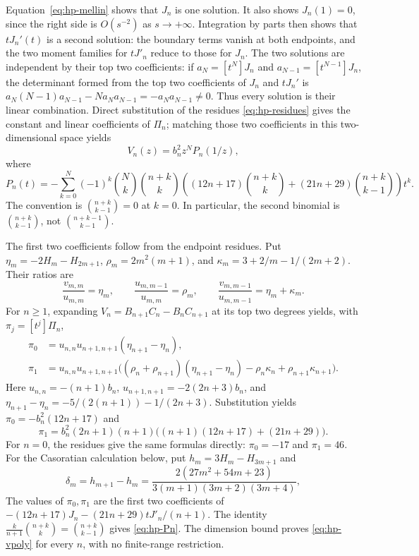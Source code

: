 Equation~\eqref{eq:hp-mellin} shows that $J_n$ is one solution.  It also
shows $J_n(1)=0$, since the right side is $O(s^{-2})$ as $s\to+\infty$.
Integration by parts then shows that $tJ_n'(t)$ is a second solution: the
boundary terms vanish at both endpoints, and the two moment families for
$tJ'_n$ reduce to those for $J_n$.  The two solutions are independent by
their top two coefficients: if $a_N=[t^N]J_n$ and
$a_{N-1}=[t^{N-1}]J_n$, the determinant formed from the top two coefficients
of $J_n$ and $tJ_n'$ is
$a_N(N-1)a_{N-1}-Na_Na_{N-1}=-a_Na_{N-1}\ne0$.  Thus every solution is
their linear combination.  Direct substitution of the residues
\eqref{eq:hp-residues}
gives the constant and linear coefficients of $\Pi_n$; matching those two
coefficients in this two-dimensional space yields
\begin{equation}\label{eq:hp-vpoly}
 V_n(z)=b_n^2z^NP_n(1/z),
\end{equation}
where
\begin{equation}\label{eq:hp-Pn}
 P_n(t)=-\sum_{k=0}^{N}(-1)^k\binom Nk\binom{n+k}{k}
 \left((12n+17)\binom{n+k}{k}
       +(21n+29)\binom{n+k}{k-1}\right)t^k.
\end{equation}
The convention is $\binom{n+k}{k-1}=0$ at $k=0$.  In particular, the
second binomial is $\binom{n+k}{k-1}$, not
$\binom{n+k-1}{k-1}$.

The first two coefficients follow from the endpoint residues. Put
$\eta_m=-2H_m-H_{2m+1}$, $\rho_m=2m^2(m+1)$, and
$\kappa_m=3+2/m-1/(2m+2)$.  Their ratios are
\[
 \frac{v_{m,m}}{u_{m,m}}=\eta_m,\qquad
 \frac{u_{m,m-1}}{u_{m,m}}=\rho_m,\qquad
 \frac{v_{m,m-1}}{u_{m,m-1}}=\eta_m+\kappa_m.
\]
For $n\ge1$, expanding $V_n=B_{n+1}C_n-B_nC_{n+1}$ at its top two
degrees yields, with $\pi_j=[t^j]\Pi_n$,
\begin{align*}
 \pi_0&=u_{n,n}u_{n+1,n+1}(\eta_{n+1}-\eta_n),\\
 \pi_1&=u_{n,n}u_{n+1,n+1}
 \bigl((\rho_n+\rho_{n+1})(\eta_{n+1}-\eta_n)
       -\rho_n\kappa_n+\rho_{n+1}\kappa_{n+1}\bigr).
\end{align*}
Here $u_{n,n}=-(n+1)b_n$, $u_{n+1,n+1}=-2(2n+3)b_n$, and
$\eta_{n+1}-\eta_n=-5/(2(n+1))-1/(2n+3)$.  Substitution yields
$\pi_0=-b_n^2(12n+17)$ and
\[
 \pi_1=b_n^2(2n+1)(n+1)
       \bigl((n+1)(12n+17)+(21n+29)\bigr).
\]
For $n=0$, the residues give the same formulas directly: $\pi_0=-17$ and
$\pi_1=46$.  For the Casoratian calculation below, put
$h_m=3H_m-H_{3m+1}$ and
\[
 \delta_m=h_{m+1}-h_m=
 \frac{2(27m^2+54m+23)}{3(m+1)(3m+2)(3m+4)},
\]
The values of $\pi_0,\pi_1$ are the first two coefficients of
$-(12n+17)J_n-(21n+29)tJ'_n/(n+1)$.  The identity
$\frac{k}{n+1}\binom{n+k}{k}=\binom{n+k}{k-1}$ gives
\eqref{eq:hp-Pn}.  The dimension bound proves \eqref{eq:hp-vpoly} for every
$n$, with no finite-range restriction.

